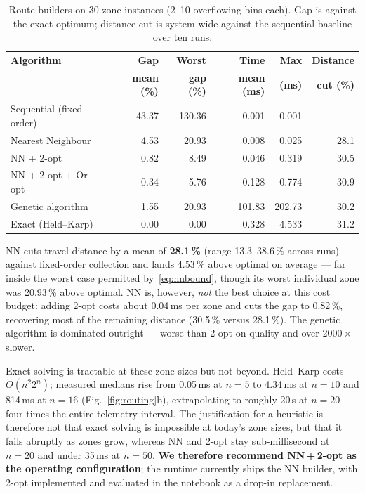 \documentclass{llncs}
\begin{document}
\begin{table}[htbp]
\centering
\caption{Route builders on 30 zone-instances (2--10 overflowing bins each).
         Gap is against the exact optimum; distance cut is system-wide against
         the sequential baseline over ten runs.}
\label{tab:routing}
\footnotesize
\renewcommand{\arraystretch}{1.05}
\setlength{\tabcolsep}{5pt}
\begin{tabular}{lrrrrr}
\toprule
\textbf{Algorithm} & \textbf{Gap} & \textbf{Worst} & \textbf{Time} &
\textbf{Max} & \textbf{Distance}\\
 & \textbf{mean (\%)} & \textbf{gap (\%)} & \textbf{mean (ms)} &
\textbf{(ms)} & \textbf{cut (\%)}\\
\midrule
Sequential (fixed order) & 43.37 & 130.36 & 0.001 & 0.001 & --- \\
Nearest Neighbour        &  4.53 &  20.93 & 0.008 & 0.025 & 28.1 \\
NN + 2-opt               &  0.82 &   8.49 & 0.046 & 0.319 & 30.5 \\
NN + 2-opt + Or-opt      &  0.34 &   5.76 & 0.128 & 0.774 & 30.9 \\
Genetic algorithm        &  1.55 &  20.93 & 101.83 & 202.73 & 30.2 \\
Exact (Held--Karp)       &  0.00 &   0.00 & 0.328 & 4.533 & 31.2 \\
\bottomrule
\end{tabular}
\end{table}

NN cuts travel distance by a mean of \textbf{28.1\,\%} (range 13.3--38.6\,\%
across runs) against fixed-order collection and lands 4.53\,\% above optimal on
average --- far inside the worst case permitted by~\eqref{eq:nnbound}, though
its worst individual zone was 20.93\,\% above optimal. NN is, however,
\emph{not} the best choice at this cost budget: adding 2-opt costs about
0.04\,ms per zone and cuts the gap to 0.82\,\%, recovering most of the
remaining distance (30.5\,\% versus 28.1\,\%). The genetic algorithm is
dominated outright --- worse than 2-opt on quality and over $2000\times$
slower.

Exact solving is tractable at these zone sizes but not beyond. Held--Karp costs
$O(n^2 2^n)$; measured medians rise from 0.05\,ms at $n=5$ to 4.34\,ms at
$n=10$ and 814\,ms at $n=16$ (Fig.~\ref{fig:routing}b), extrapolating to
roughly 20\,s at $n=20$ --- four times the entire telemetry interval. The
justification for a heuristic is therefore not that exact solving is impossible
at today's zone sizes, but that it fails abruptly as zones grow, whereas NN and
2-opt stay sub-millisecond at $n=20$ and under 35\,ms at $n=50$.
\textbf{We therefore recommend NN\,+\,2-opt as the operating configuration};
the runtime currently ships the NN builder, with 2-opt implemented and
evaluated in the notebook as a drop-in replacement.
\end{document}

